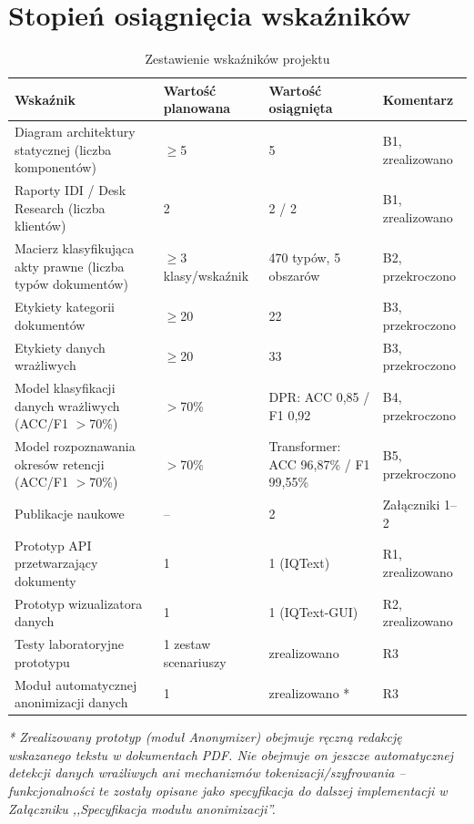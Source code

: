 \documentclass[12pt,a4paper]{report}
\begin{document}
\section{Stopień osiągnięcia wskaźników}
\begin{table}[h]
    \centering
    \caption{Zestawienie wskaźników projektu}
    \begin{tabular}{p{} p{} p{} p{}}
        \toprule
        Wskaźnik & Wartość planowana & Wartość osiągnięta & Komentarz \\
        \midrule
        Diagram architektury statycznej (liczba komponentów) & $\geq$5 & 5 & B1, zrealizowano \\
        Raporty IDI / Desk Research (liczba klientów) & 2 & 2 / 2 & B1, zrealizowano \\
        Macierz klasyfikująca akty prawne (liczba typów dokumentów) & $\geq$3 klasy/wskaźnik & 470 typów, 5 obszarów & B2, przekroczono \\
        Etykiety kategorii dokumentów & $\geq$20 & 22 & B3, przekroczono \\
        Etykiety danych wrażliwych & $\geq$20 & 33 & B3, przekroczono \\
        Model klasyfikacji danych wrażliwych (ACC/F1 $>$70\%) & $>$70\% & DPR: ACC 0,85 / F1 0,92 & B4, przekroczono \\
        Model rozpoznawania okresów retencji (ACC/F1 $>$70\%) & $>$70\% & Transformer: ACC 96,87\% / F1 99,55\% & B5, przekroczono \\
        Publikacje naukowe & -- & 2 & Załączniki 1--2 \\
        Prototyp API przetwarzający dokumenty & 1 & 1 (IQText) & R1, zrealizowano \\
        Prototyp wizualizatora danych & 1 & 1 (IQText-GUI) & R2, zrealizowano \\
        Testy laboratoryjne prototypu & 1 zestaw scenariuszy & zrealizowano & R3 \\
        Moduł automatycznej anonimizacji danych & 1 & zrealizowano * & R3 \\
        \bottomrule
    \end{tabular}
\end{table}

\textit{* Zrealizowany prototyp (moduł Anonymizer) obejmuje ręczną redakcję wskazanego tekstu w dokumentach PDF. Nie obejmuje on jeszcze automatycznej detekcji danych wrażliwych ani mechanizmów tokenizacji/szyfrowania -- funkcjonalności te zostały opisane jako specyfikacja do dalszej implementacji w Załączniku ,,Specyfikacja modułu anonimizacji''.}
\end{document}
